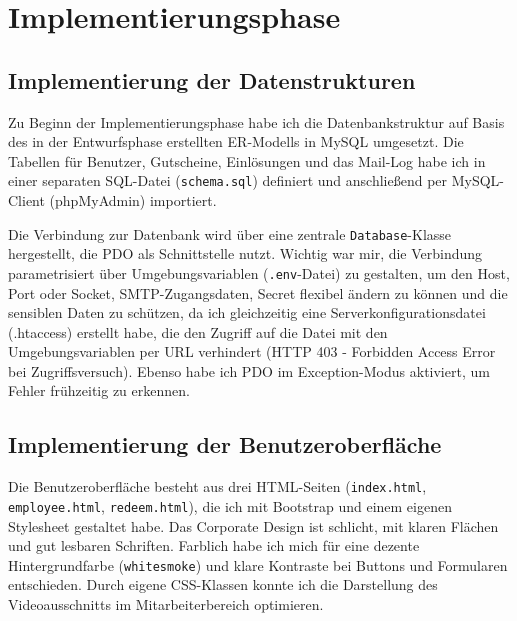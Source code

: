 \section{Implementierungsphase} 
\label{sec:Implementierungsphase}

\subsection{Implementierung der Datenstrukturen}
\label{sec:ImplementierungDatenstrukturen}

Zu Beginn der Implementierungsphase habe ich die Datenbankstruktur auf Basis des in der Entwurfsphase erstellten ER-Modells in MySQL umgesetzt.
Die Tabellen für Benutzer, Gutscheine, Einlösungen und das Mail-Log habe ich in einer separaten SQL-Datei (\texttt{schema.sql}) definiert und anschließend per MySQL-Client (phpMyAdmin) importiert.



Die Verbindung zur Datenbank wird über eine zentrale \texttt{Database}-Klasse hergestellt, die \ac{PDO} als Schnittstelle nutzt.
Wichtig war mir, die Verbindung parametrisiert über Umgebungsvariablen (\texttt{.env}-Datei) zu gestalten, um den Host, Port oder Socket, SMTP-Zugangsdaten, Secret \usw flexibel ändern zu können und die sensiblen Daten zu schützen, da ich gleichzeitig eine Serverkonfigurationsdatei (.htaccess) erstellt habe, die den Zugriff auf die Datei mit den Umgebungsvariablen per \ac{URL} verhindert (HTTP 403 - Forbidden Access Error bei Zugriffsversuch).
Ebenso habe ich \ac{PDO} im Exception-Modus aktiviert, um Fehler frühzeitig zu erkennen.



\subsection{Implementierung der Benutzeroberfläche}
\label{sec:ImplementierungBenutzeroberflaeche}

Die Benutzeroberfläche besteht aus drei HTML-Seiten (\texttt{index.html}, \texttt{employee.html}, \texttt{redeem.html}),
die ich mit Bootstrap und einem eigenen Stylesheet gestaltet habe.
Das Corporate Design ist schlicht, mit klaren Flächen und gut lesbaren Schriften.
Farblich habe ich mich für eine dezente Hintergrundfarbe (\texttt{whitesmoke}) und klare Kontraste bei Buttons und Formularen entschieden.
Durch eigene CSS-Klassen konnte ich \zB die Darstellung des Videoausschnitts im Mitarbeiterbereich optimieren.

